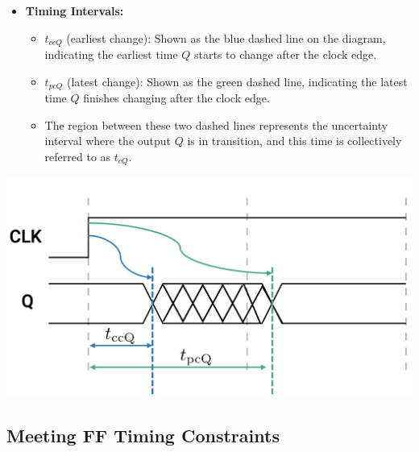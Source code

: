 \documentclass[12pt,openany]{book}
\begin{document}
\vspace*{5px}
\noindent
\hspace*{-33px}
\begin{minipage}{0.6\textwidth}
	\begin{itemize}
		\item[] \textbf{Timing Intervals:}
		\begin{itemize}
			\item \( t_{ccQ} \) (earliest change): Shown as the blue dashed line on the diagram, indicating the earliest time \( Q \) starts to change after the clock edge.
			\item \( t_{pcQ} \) (latest change): Shown as the green dashed line, indicating the latest time \( Q \) finishes changing after the clock edge.
			\item The region between these two dashed lines represents the uncertainty interval where the output \( Q \) is in transition, and this time is collectively referred to as \( t_{cQ} \).
		\end{itemize}
	\end{itemize}
\end{minipage}
\hfill
\hfill
\begin{minipage}{0.45\textwidth}
	\centering
	\includegraphics[width=1.1\textwidth]{circuits/15.1.1_2.png}
\end{minipage}


\subsection{Meeting FF Timing Constraints}
\end{document}
